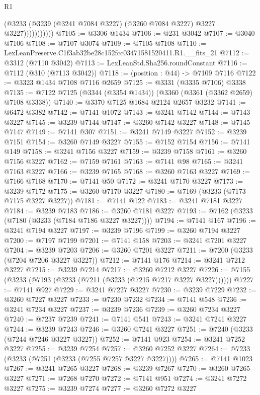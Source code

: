 \begin{lexlean}{R1}
\begin{coremodule}
                      (@3233 (@3239 (@3241 @7084 @3227) (@3260 @7084 @3227) @3227 @3227)))))))))))
@7105 := @3306 @1434
@7106 := @231 @3042
@7107 := @3040 @7106
@7108 := @7107 @3074
@7109 := @7105 @7108
@7110 := LexLeanPreserve.C1f3ab32be28c152fcc03471581520411.R1.__fits_21
@7112 := @3312 (@7110 @3042)
@7113 := LexLeanStd.Sha256.roundConstant
@7116 := @7112 (@310 (@7113 @3042))
@7118 := (position : @44) -> @7109 @7116
@7122 := @3323 @1434 @7108 @7116 @2659
@7125 := @3331 (@3335 @7106) @3338
@7135 := @7122 @7125 (@3344 (@3354 @1434)) (@3360 (@3361 (@3362 @2659) @7108 @3338))
@7140 := @3370 @7125 @1684 @2124 @2657 @3232
@7141 := @6472 @3382
@7142 := @7141 @1072
@7143 := @3241 @7142
@7144 := @7143 @3227
@7145 := @3239 @7144
@7147 := @3260 @7142 @3227
@7148 := @7145 @7147
@7149 := @7141 @307
@7151 := @3241 @7149 @3227
@7152 := @3239 @7151
@7154 := @3260 @7149 @3227
@7155 := @7152 @7154
@7156 := @7141 @149
@7158 := @3241 @7156 @3227
@7159 := @3239 @7158
@7161 := @3260 @7156 @3227
@7162 := @7159 @7161
@7163 := @7141 @98
@7165 := @3241 @7163 @3227
@7166 := @3239 @7165
@7168 := @3260 @7163 @3227
@7169 := @7166 @7168
@7170 := @7141 @50
@7172 := @3241 @7170 @3227
@7173 := @3239 @7172
@7175 := @3260 @7170 @3227
@7180 := @7169 (@3233 (@7173 @7175 @3227 @3227))
@7181 := @7141 @122
@7183 := @3241 @7181 @3227
@7184 := @3239 @7183
@7186 := @3260 @7181 @3227
@7193 := @7162 (@3233 (@7180 (@3233 (@7184 @7186 @3227 @3227))))
@7194 := @7141 @167
@7196 := @3241 @7194 @3227
@7197 := @3239 @7196
@7199 := @3260 @7194 @3227
@7200 := @7197 @7199
@7201 := @7141 @158
@7203 := @3241 @7201 @3227
@7204 := @3239 @7203
@7206 := @3260 @7201 @3227
@7211 := @7200 (@3233 (@7204 @7206 @3227 @3227))
@7212 := @7141 @176
@7214 := @3241 @7212 @3227
@7215 := @3239 @7214
@7217 := @3260 @7212 @3227
@7226 := @7155 (@3233 (@7193 (@3233 (@7211 (@3233 (@7215 @7217 @3227 @3227))))))
@7227 := @7141 @927
@7229 := @3241 @7227 @3227
@7230 := @3239 @7229
@7232 := @3260 @7227 @3227
@7233 := @7230 @7232
@7234 := @7141 @548
@7236 := @3241 @7234 @3227
@7237 := @3239 @7236
@7239 := @3260 @7234 @3227
@7240 := @7237 @7239
@7241 := @7141 @541
@7243 := @3241 @7241 @3227
@7244 := @3239 @7243
@7246 := @3260 @7241 @3227
@7251 := @7240 (@3233 (@7244 @7246 @3227 @3227))
@7252 := @7141 @923
@7254 := @3241 @7252 @3227
@7255 := @3239 @7254
@7257 := @3260 @7252 @3227
@7264 := @7233 (@3233 (@7251 (@3233 (@7255 @7257 @3227 @3227))))
@7265 := @7141 @1023
@7267 := @3241 @7265 @3227
@7268 := @3239 @7267
@7270 := @3260 @7265 @3227
@7271 := @7268 @7270
@7272 := @7141 @951
@7274 := @3241 @7272 @3227
@7275 := @3239 @7274
@7277 := @3260 @7272 @3227

\end{coremodule}
\end{lexlean}
